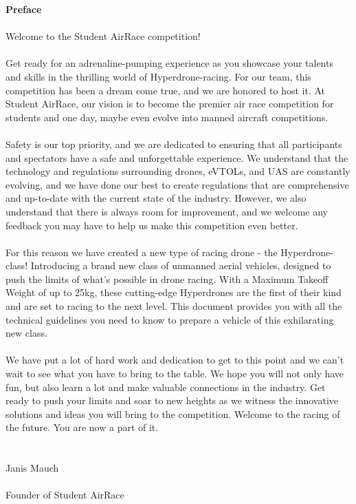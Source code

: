 \newpage
{\bf Preface}
\\ \\ Welcome to the Student AirRace competition! \\ \\
Get ready for an adrenaline-pumping experience as you showcase your talents and skills in the thrilling world of Hyperdrone-racing. 
For our team, this competition has been a dream come true, and we are honored to host it. 
At Student AirRace, our vision is to become the premier air race competition for students and one day, maybe even evolve into manned aircraft competitions.
\\ \\ 
Safety is our top priority, and we are dedicated to ensuring that all participants and spectators have a safe and unforgettable experience. 
We understand that the technology and regulations surrounding drones, eVTOLs, and UAS are constantly evolving, and we have done our best to create regulations that are comprehensive and up-to-date with the current state of the industry. 
However, we also understand that there is always room for improvement, and we welcome any feedback you may have to help us make this competition even better.
\\ \\ 
For this reason we have created a new type of racing drone - the Hyperdrone-class! Introducing a brand new class of unmanned aerial vehicles, designed to push the limits of what's possible in drone racing. With a Maximum Takeoff Weight of up to 25kg, these cutting-edge Hyperdrones are the first of their kind and are set to racing to the next level. This document provides you with all the technical guidelines you need to know to prepare a vehicle of this exhilarating new class. 
\\ \\
We have put a lot of hard work and dedication to get to this point and we can't wait to see what you have to bring to the table. 
We hope you will not only have fun, but also learn a lot and make valuable connections in the industry. 
Get ready to push your limits and soar to new heights as we witness the innovative solutions and ideas you will bring to the competition. 
Welcome to the racing of the future. You are now a part of it.
\\ \\ \\
Janis Mauch 
\\ \\Founder of Student AirRace

